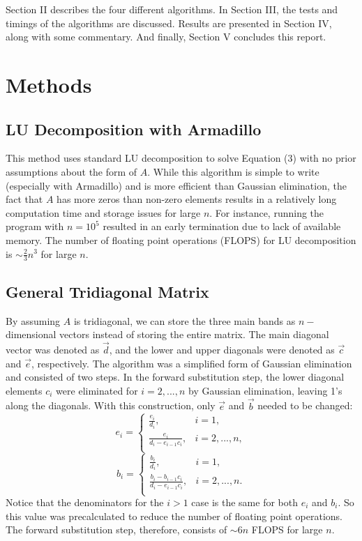 \documentclass[prb,aps,twocolumn,showpacs,10pt]{revtex4-1}
\begin{document}
Section II describes the four different algorithms. In Section III, the tests and timings of the algorithms are discussed. Results are presented in Section IV, along with some commentary. And finally, Section V concludes this report.


\section{Methods}

\subsection{LU Decomposition with Armadillo}

This method uses standard LU decomposition to solve Equation (3) with no prior assumptions about the form of $A$. While this algorithm is simple to write (especially with Armadillo) and is more efficient than Gaussian elimination, the fact that $A$ has more zeros than non-zero elements results in a relatively long computation time and storage issues for large $n$. For instance, running the program with $n=10^5$ resulted in an early termination due to lack of available memory. The number of floating point operations (FLOPS) for LU decomposition is $\sim \frac{2}{3}n^3$ for large $n$.

\subsection{General Tridiagonal Matrix}

By assuming $A$ is tridiagonal, we can store the three main bands as $n-$dimensional vectors instead of storing the entire matrix. The main diagonal vector was denoted as $\vec{d}$, and the lower and upper diagonals were denoted as $\vec{c}$ and $\vec{e}$, respectively. The algorithm was a simplified form of Gaussian elimination and consisted of two steps. In the forward substitution step, the lower diagonal elements $c_i$ were eliminated for $i=2,...,n$ by Gaussian elimination, leaving 1's along the diagonals. With this construction, only $\vec{e}$ and $\vec{b}$ needed to be changed:
\begin{equation}
e_i = \begin{cases} 
      \frac{e_i}{d_i}, &i=1,\\
      \frac{e_i}{d_i-e_{i-1}c_i}, &i=2,...,n,\\
   \end{cases}
\end{equation}
\begin{equation}
b_i = \begin{cases} 
      \frac{b_i}{d_i}, &i=1,\\
      \frac{b_i-b_{i-1}c_i}{d_i-e_{i-1}c_i}, &i=2,...,n.\\
   \end{cases}
\end{equation}
Notice that the denominators for the $i>1$ case is the same for both $e_i$ and $b_i$. So this value was precalculated to reduce the number of floating point operations. The forward substitution step, therefore, consists of $\sim 6n$ FLOPS for large $n$.\\
\end{document}
